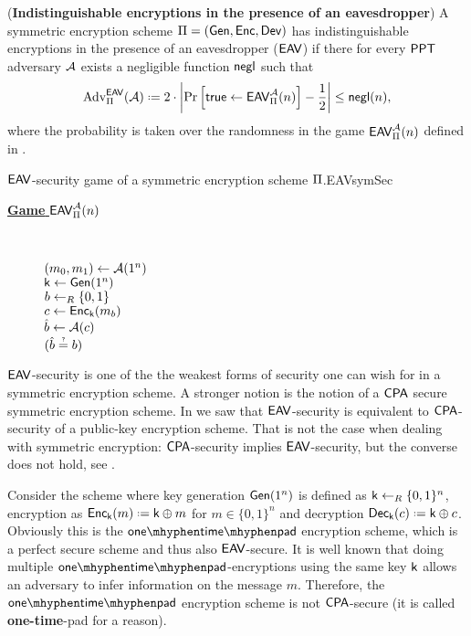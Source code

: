 \begin{defn}
(\textbf{Indistinguishable encryptions in the presence of an eavesdropper}) A symmetric encryption scheme $\operatorname{\Pi} = (\operatorname{\mathsf{Gen}},\operatorname{\mathsf{Enc}},\operatorname{\mathsf{Dev}})$ has indistinguishable encryptions in the presence of an eavesdropper ($\mathsf{EAV}$) if there for every $\mathsf{PPT}$ adversary $\mathcal{A}$ exists a negligible function $\operatorname{\mathsf{negl}}$ such that
\begin{align*}
	\adv_{\spkcs}^{\EAV}(\adve) \defeq 2\cdot \left\vert \prob{\true\leftarrow \EAV_{\spkcs}^{\adve}(n)} - \frac{1}{2} \right\vert \leq \negl(n),
\end{align*}
where the probability is taken over the randomness in the game $\mathsf{EAV}_{\operatorname{\Pi}}^{\mathcal{A}}(n)$ defined in .

\begin{boxfigGame}{$\mathsf{EAV}$-security game of a symmetric encryption scheme $\operatorname{\Pi}$.}{EAVsymSec}
  \begin{description}
	\item[\underline{\textbf{Game} $\mathsf{EAV}_{\operatorname{\Pi}}^{\mathcal{A}}(n)$}] ~
 	
		$(m_0,m_1)\leftarrow \mathcal{A}(1^n)$ \\
		$\mathsf{k}\leftarrow \operatorname{\mathsf{Gen}}(1^n)$ \\
		$b\leftarrow_R\{0,1\}$ \\
		$c\leftarrow \operatorname{\mathsf{Enc}}_{\mathsf{k}}(m_b)$ \\
		$\hat{b}\leftarrow \mathcal{A}(c)$ \\
		\Ret $\askequal{\hat{b}}{b}$ 
		
  \end{description}
\end{boxfigGame}

\end{defn}

$\mathsf{EAV}$-security is one of the the weakest forms of security one can wish for in a symmetric encryption scheme. A stronger notion is the notion of a $\mathsf{CPA}$ secure symmetric encryption scheme. In  we saw that $\mathsf{EAV}$-security is equivalent to $\mathsf{CPA}$-security of a public-key encryption scheme. That is not the case when dealing with symmetric encryption: $\mathsf{CPA}$-security implies $\mathsf{EAV}$-security, but the converse does not hold, see .

\begin{ex}
Consider the scheme where key generation $\operatorname{\mathsf{Gen}}(1^n)$ is defined as $\mathsf{k}\leftarrow_R\{0,1\}^n$, encryption as $\enc_{\key}(m) \defeq \key\oplus m$ for $m\in\{0,1\}^n$ and decryption $\dec_{\key}(c) \defeq \key\oplus c$. Obviously this is the $\onetimepad$ encryption scheme, which is a perfect secure scheme and thus also $\mathsf{EAV}$-secure. It is well known that doing multiple $\onetimepad$-encryptions using the same key $\mathsf{k}$ allows an adversary to infer information on the message $m$. Therefore, the $\onetimepad$ encryption scheme is not $\mathsf{CPA}$-secure (it is called \textbf{one-time}-pad for a reason). 
\end{ex}

